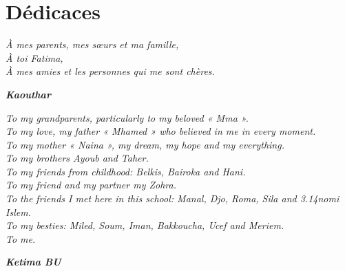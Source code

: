  
 \chapter*{Dédicaces}%



\begin{center}
\textit{À mes parents, mes sœurs et ma famille,\\
À toi Fatima,\\
À mes amies et les personnes qui me sont chères.\\
}
\end{center}

\begin{flushright}
	\textit{\textbf{Kaouthar}}
\end{flushright}
\vspace{20px}
\begin{center}
\textit{To my grandparents, particularly to my beloved « Mma ».\\
	To my love, my father « Mhamed » who believed in me in every moment.\\
	To my mother « Naina », my dream, my hope and my everything.\\
	To my brothers Ayoub and Taher.\\
	To my friends from childhood: Belkis, Bairoka and Hani.\\
	To my friend and my partner my Zohra.\\
	To the friends I met here in this school: Manal, Djo, Roma, Sila and 3.14nomi Islem.\\
	To my besties: Miled, Soum, Iman, Bakkoucha, Ucef and Meriem. \\
	To me.\\}
\end{center}
\begin{flushright}
	\textit{\textbf{Ketima BU}}
\end{flushright}


\clearpage